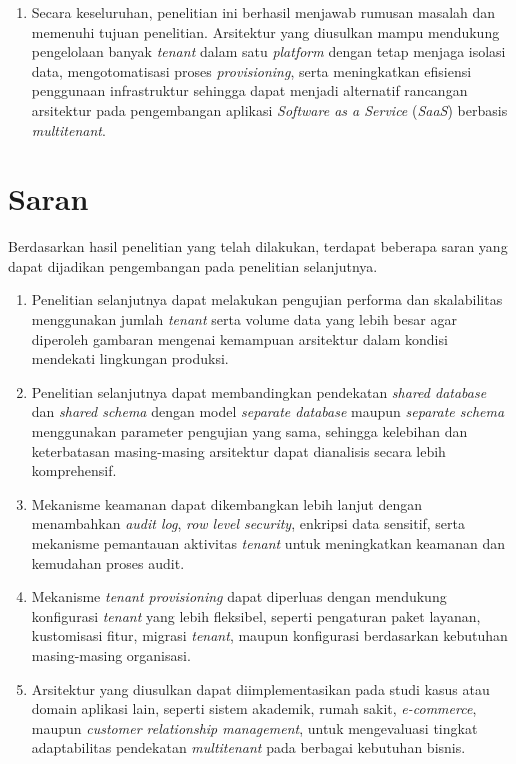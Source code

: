 \begin{enumerate}
  \item Secara keseluruhan, penelitian ini berhasil menjawab rumusan masalah dan memenuhi tujuan penelitian. Arsitektur yang diusulkan mampu mendukung pengelolaan banyak \textit{tenant} dalam satu \textit{platform} dengan tetap menjaga isolasi data, mengotomatisasi proses \textit{provisioning}, serta meningkatkan efisiensi penggunaan infrastruktur sehingga dapat menjadi alternatif rancangan arsitektur pada pengembangan aplikasi \textit{Software as a Service} (\textit{SaaS}) berbasis \textit{multitenant}.
\end{enumerate}

\section{Saran}

Berdasarkan hasil penelitian yang telah dilakukan, terdapat beberapa saran yang dapat dijadikan pengembangan pada penelitian selanjutnya.

\begin{enumerate}
  \item Penelitian selanjutnya dapat melakukan pengujian performa dan skalabilitas menggunakan jumlah \textit{tenant} serta volume data yang lebih besar agar diperoleh gambaran mengenai kemampuan arsitektur dalam kondisi mendekati lingkungan produksi.

  \item Penelitian selanjutnya dapat membandingkan pendekatan \textit{shared database} dan \textit{shared schema} dengan model \textit{separate database} maupun \textit{separate schema} menggunakan parameter pengujian yang sama, sehingga kelebihan dan keterbatasan masing-masing arsitektur dapat dianalisis secara lebih komprehensif.

  \item Mekanisme keamanan dapat dikembangkan lebih lanjut dengan menambahkan \textit{audit log}, \textit{row level security}, enkripsi data sensitif, serta mekanisme pemantauan aktivitas \textit{tenant} untuk meningkatkan keamanan dan kemudahan proses audit.

  \item Mekanisme \textit{tenant provisioning} dapat diperluas dengan mendukung konfigurasi \textit{tenant} yang lebih fleksibel, seperti pengaturan paket layanan, kustomisasi fitur, migrasi \textit{tenant}, maupun konfigurasi berdasarkan kebutuhan masing-masing organisasi.

  \item Arsitektur yang diusulkan dapat diimplementasikan pada studi kasus atau domain aplikasi lain, seperti sistem akademik, rumah sakit, \textit{e-commerce}, maupun \textit{customer relationship management}, untuk mengevaluasi tingkat adaptabilitas pendekatan \textit{multitenant} pada berbagai kebutuhan bisnis.
\end{enumerate}
